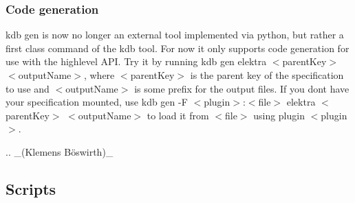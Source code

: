 \subsubsection*{Code generation}

{\ttfamily kdb gen} is now no longer an external tool implemented via python, but rather a first class command of the {\ttfamily kdb} tool. For now it only supports code generation for use with the highlevel A\+PI. Try it by running {\ttfamily kdb gen elektra $<$parent\+Key$>$ $<$output\+Name$>$}, where {\ttfamily $<$parent\+Key$>$} is the parent key of the specification to use and {\ttfamily $<$output\+Name$>$} is some prefix for the output files. If you don\textquotesingle{}t have your specification mounted, use {\ttfamily kdb gen -\/F $<$plugin$>$\+:$<$file$>$ elektra $<$parent\+Key$>$ $<$output\+Name$>$} to load it from {\ttfamily $<$file$>$} using plugin {\ttfamily $<$plugin$>$}.

.. \+\_\+(Klemens Böswirth)\+\_\+

\subsection*{Scripts}


